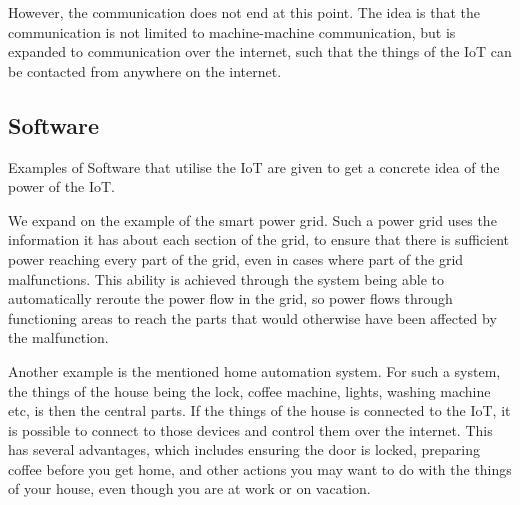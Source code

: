 However, the communication does not end at this point.
The idea is that the communication is not limited to machine-machine communication, but is expanded to communication over the internet, such that the things of the IoT can be contacted from anywhere on the internet.

\subsection{Software}
Examples of Software that utilise the IoT are given to get a concrete idea of the power of the IoT.

We expand on the example of the smart power grid.
Such a power grid uses the information it has about each section of the grid, to ensure that there is sufficient power reaching every part of the grid, even in cases where part of the grid malfunctions.
This ability is achieved through the system being able to automatically reroute the power flow in the grid, so power flows through functioning areas to reach the parts that would otherwise have been affected by the malfunction.

Another example is the mentioned home automation system.
For such a system, the things of the house being the lock, coffee machine, lights, washing machine etc, is then the central parts.
If the things of the house is connected to the IoT, it is possible to connect to those devices and control them over the internet.
This has several advantages, which includes ensuring the door is locked, preparing coffee before you get home, and other actions you may want to do with the things of your house, even though you are at work or on vacation.